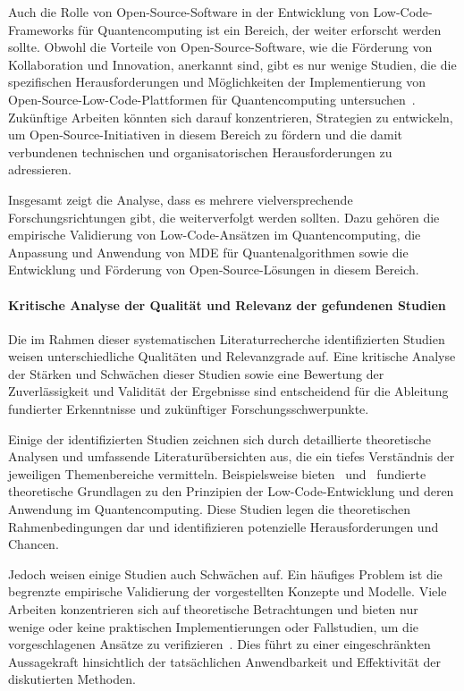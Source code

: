 Auch die Rolle von Open-Source-Software in der Entwicklung von Low-Code-Frameworks für Quantencomputing ist ein Bereich, 
der weiter erforscht werden sollte. Obwohl die Vorteile von Open-Source-Software, wie die Förderung von Kollaboration und 
Innovation, anerkannt sind, gibt es nur wenige Studien, die die spezifischen Herausforderungen und Möglichkeiten der 
Implementierung von Open-Source-Low-Code-Plattformen für Quantencomputing untersuchen~\cite{Amato_2023, Ahmad_2023}. 
Zukünftige Arbeiten könnten sich darauf konzentrieren, Strategien zu entwickeln, um Open-Source-Initiativen in diesem 
Bereich zu fördern und die damit verbundenen technischen und organisatorischen Herausforderungen zu adressieren.

Insgesamt zeigt die Analyse, dass es mehrere vielversprechende Forschungsrichtungen gibt, die weiterverfolgt werden sollten. 
Dazu gehören die empirische Validierung von Low-Code-Ansätzen im Quantencomputing, die Anpassung und Anwendung von MDE für 
Quantenalgorithmen sowie die Entwicklung und Förderung von Open-Source-Lösungen in diesem Bereich. 

\paragraph{Kritische Analyse der Qualität und Relevanz der gefundenen Studien}

Die im Rahmen dieser systematischen Literaturrecherche identifizierten Studien weisen unterschiedliche 
Qualitäten und Relevanzgrade auf. Eine kritische Analyse der Stärken und Schwächen dieser Studien sowie eine Bewertung 
der Zuverlässigkeit und Validität der Ergebnisse sind entscheidend für die Ableitung fundierter Erkenntnisse und zukünftiger Forschungsschwerpunkte.

Einige der identifizierten Studien zeichnen sich durch detaillierte theoretische Analysen und umfassende 
Literaturübersichten aus, die ein tiefes Verständnis der jeweiligen Themenbereiche vermitteln. 
Beispielsweise bieten~\cite{Perez-Delgado_2020} und~\cite{Gemeinhardt_2021} fundierte theoretische Grundlagen 
zu den Prinzipien der Low-Code-Entwicklung und deren Anwendung im Quantencomputing. Diese Studien legen die 
theoretischen Rahmenbedingungen dar und identifizieren potenzielle Herausforderungen und Chancen.

Jedoch weisen einige Studien auch Schwächen auf. Ein häufiges Problem ist die begrenzte empirische Validierung 
der vorgestellten Konzepte und Modelle. Viele Arbeiten konzentrieren sich auf theoretische Betrachtungen und 
bieten nur wenige oder keine praktischen Implementierungen oder Fallstudien, um die vorgeschlagenen Ansätze 
zu verifizieren~\cite{Amato_2023}. Dies führt zu einer eingeschränkten Aussagekraft hinsichtlich der tatsächlichen 
Anwendbarkeit und Effektivität der diskutierten Methoden.

